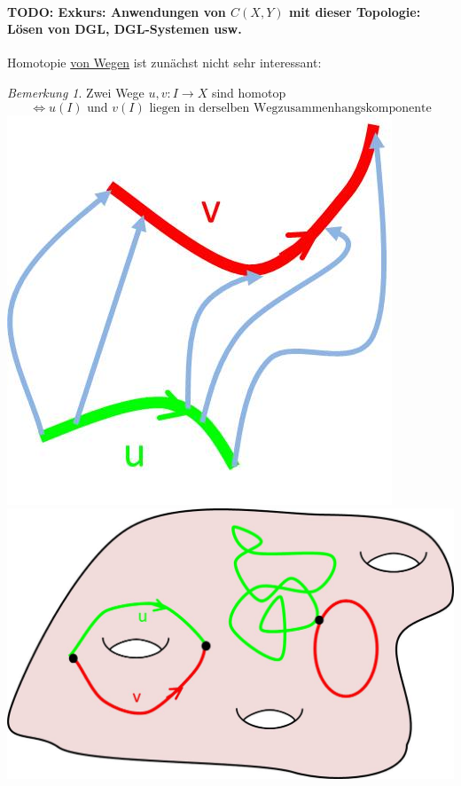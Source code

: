 \documentclass[a4paper,11pt,notitlepage]{report}
\theoremstyle{remark}
\newtheorem{remark}{Bemerkung}[chapter]
\theoremstyle{definition}
\begin{document}
\paragraph{TODO: Exkurs: Anwendungen von $C(X,Y)$ mit dieser Topologie: Lösen von DGL, DGL-Systemen usw.}

Homotopie \underline{von Wegen} ist zunächst nicht sehr interessant:

\begin{remark}{}
	Zwei Wege $u,v \colon I \rightarrow X$ sind homotop
	$$\Leftrightarrow u(I) \text{ und } v(I) \text{ liegen in derselben Wegzusammenhangskomponente}$$
	\includegraphics[scale=0.5]{images/Homotopie_zwischen_Wegen.jpg} \includegraphics[scale=0.35]{images/Homotopie_zwischen_Wegen2.jpg}
\end{remark}
\end{document}
